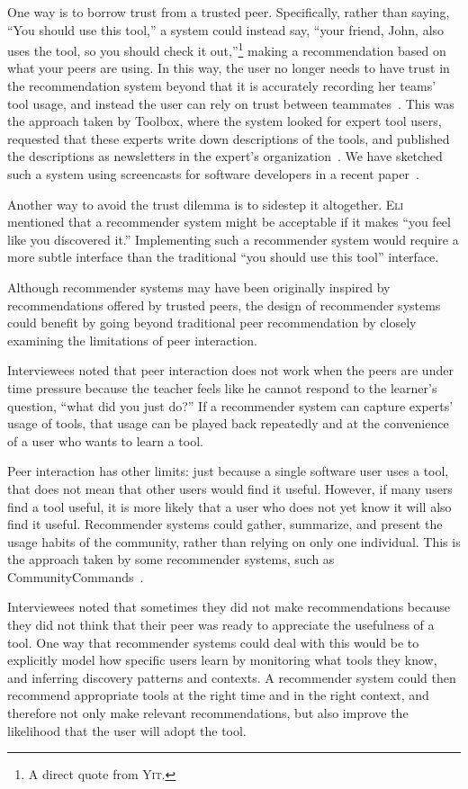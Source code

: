 \documentclass[smallextended]{svjour3}
\newcommand\discovery{peer interaction\xspace}
\newcommand\Discovery{Peer interaction\xspace}
\newcommand\DisCovery{Peer Interaction\xspace}
\newcommand\discpush{peer recommendation\xspace}
\newcommand{\subject}[1]{\textsc{#1}}
\newcommand{\csub}{{\subject{Eli}}\xspace}
\newcommand{\jsub}{{\subject{Yit}}\xspace}
\begin{document}
One way is to borrow trust from a trusted peer. 
Specifically, rather than saying, ``You should use this tool,'' a
system could instead say, ``your friend, John, also uses the
tool, so you should check it out,''\footnote{A direct quote from \jsub.} making
a recommendation based on what your peers are using.
In this way, the user no longer needs to have trust in the recommendation
system beyond that it is accurately recording her teams' tool usage, and
instead the user can rely on trust between teammates~\cite{murphyHill12b}.
This was the approach taken by Toolbox, where the system
looked for expert tool users, requested that these experts write down
descriptions of the tools, and published the descriptions as newsletters in
the expert's organization~\cite{maltzahn}.
We have sketched such a system using screencasts 
for software developers in a recent paper~\cite{murphyHill12b}.

Another way to avoid the trust dilemma is to sidestep it altogether.
\csub mentioned that a recommender system might be acceptable if it makes ``you
feel like you discovered it.''
Implementing such a recommender system would require a more subtle interface
than the traditional ``you should use this tool'' interface.

\paraHead{Beyond \DisCovery.}
Although recommender systems may have been originally inspired by
recommendations offered by trusted peers, the design of recommender systems
could benefit by going beyond traditional \discpush by closely
examining the limitations of \discovery.

Interviewees noted that \discovery does not work when the peers are under time
pressure because the teacher feels like he cannot respond to the learner's
question, ``what did you just do?''
If a recommender system can capture experts' usage of tools, that
usage can be played back repeatedly and at the convenience of a user who
wants to learn a tool.

\Discovery has other limits: just because a single software user uses a tool,
that does not mean that other users would find it useful.
However, if many users find a tool useful, it is more likely that a
user who does not yet know it will also find it useful.
Recommender systems could gather, summarize, and present the usage habits of
the community, rather than relying on only one individual.
This is the approach taken by some recommender systems, such as
CommunityCommands~\cite{matejka09}.

Interviewees noted that sometimes they did not make recommendations because they
did not think that their peer was ready to appreciate the usefulness of a tool.
One way that recommender systems could deal with this would be to explicitly
model how specific users learn by monitoring what tools they know,
and inferring discovery patterns and contexts. 
A recommender system could then recommend appropriate tools at the right time
and in the right context, and therefore not only make relevant
recommendations, but also improve the likelihood that the user will
adopt the tool.
\end{document}
